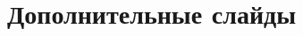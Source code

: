 \begin{comment}


  \newcommand{\ite}[3]{\ensuremath{(\text{if } #1\text{ then }#2\text{ else }#3})}}
\begin{frame}{Рекурсия в call-by-name}
  $$
  Y\equiv \lam{f}{\lam{x}{f(xx)}\lam{x}{f(xx)}}
  $$
  \[
  YR = \lam{x}{R(xx)} \lam{x}{R(xx)} \nor
  R\big( \lam{x}{R(xx)}\lam{x}{R(xx)} \big) =
  R(YR)
  \]

  \vspace{1em}

  Факториал: $fac \equiv (\lambda self.\lambda n . \ite{n<2}{1}{n \cdot self(n-1)})$
  \begin{align*}
    Y(\lambda self.\lambda n . \ite{n<2}{1}{n \cdot self(n-1)}) 2 &\cbn \\
    (\lambda n . \ite{n<2}{1}{n \cdot Y\ fac(n-1)}) 2 &\cbn \\
    2 \cdot Y\ fac\ (2-1) &\cbn \\
    2 \cdot (Y(\lambda self.\lambda n . \ite{n<2}{1}{n \cdot self(n-1)})\ 1) &\cbn \\
    2 \cdot \ite{1<2}{1}{n \cdot (Y\ fac\ (1-1))} &\cbn \\
    2 \cdot 1 & \cbn 2
  \end{align*}

\end{frame}
\end{comment}



\section{Дополнительные слайды}

